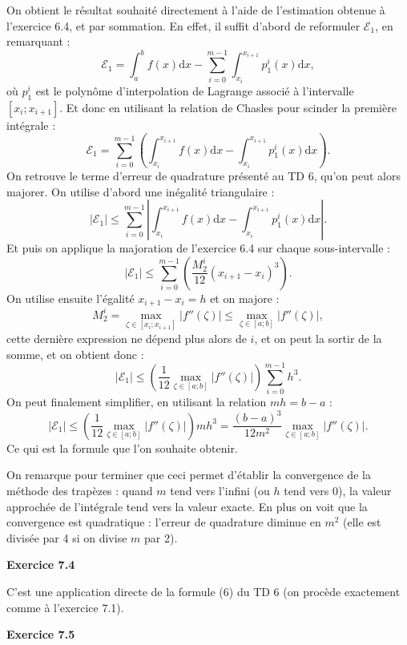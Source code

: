 \documentclass{article}
\begin{document}
On obtient le résultat souhaité directement à l'aide de l'estimation obtenue à l'exercice 6.4, et par sommation. En effet, il suffit d'abord de reformuler $\mathcal{E}_1$, en remarquant :
\[
\mathcal{E}_1 = \int_a^b f(x) \mathrm{d}x - \sum_{i=0}^{m-1} \int_{x_i}^{x_{i+1}} p_1^i(x) \mathrm{d}x,
\]
où $p_1^i$ est le polynôme d'interpolation de Lagrange associé à l'intervalle $[x_i;x_{i+1}]$.
Et donc en utilisant la relation de Chasles pour scinder la première intégrale :
\[
\mathcal{E}_1 = \sum_{i=0}^{m-1} \left (\int_{x_i}^{x_{i+1}} f(x) \mathrm{d}x - \int_{x_i}^{x_{i+1}} p_1^i(x) \mathrm{d}x \right ).
\]
On retrouve le terme d'erreur de quadrature présenté au TD 6, qu'on peut alors majorer. On utilise d'abord une inégalité triangulaire :
\[
| \mathcal{E}_1 | \leq  \sum_{i=0}^{m-1} \left  | \int_{x_i}^{x_{i+1}} f(x) \mathrm{d}x - \int_{x_i}^{x_{i+1}} p_1^i(x) \mathrm{d}x \right |.
\]
Et puis on applique la majoration de l'exercice 6.4 sur chaque sous-intervalle :
\[
| \mathcal{E}_1 | \leq  \sum_{i=0}^{m-1} \left  ( \frac{M_2^i}{12} (x_{i+1}-x_i)^3 \right ).
\]
On utilise ensuite l'égalité $x_{i+1}-x_i=h$ et on majore :
\[
M_2^i = \max_{\zeta \in [x_i;x_{i+1}]} |f''(\zeta)| \leq
\max_{\zeta \in [a;b]} |f''(\zeta)|,
\]
cette dernière expression ne dépend plus alors de $i$, et on peut la sortir de la somme, et on obtient donc :
\[
| \mathcal{E}_1 | \leq  \left  ( \frac{1}{12} \max_{\zeta \in [a;b]} |f''(\zeta)|  \right ) \sum_{i=0}^{m-1} h^3.
\]
On peut finalement simplifier, en utilisant la relation $m h = b - a$ :
\[
| \mathcal{E}_1 | \leq  \left  ( \frac{1}{12} \max_{\zeta \in [a;b]} |f''(\zeta)|  \right ) m h^3
= \frac{(b-a)^3}{12 m^2} \max_{\zeta \in [a;b]} |f''(\zeta)|. 
\]
Ce qui est la formule que l'on souhaite obtenir.

\medskip

On remarque pour terminer que ceci permet d'établir la convergence de la méthode des trapèzes : quand $m$ tend vers l'infini (ou $h$ tend vers $0$), la valeur approchée de l'intégrale tend vers la valeur exacte. En plus on voit que la convergence est quadratique : l'erreur de quadrature diminue en $m^2$ (elle est divisée par 4 si on divise $m$ par 2).

\medskip

{\bf Exercice 7.4}

C'est une application directe de la formule (6) du TD 6 (on procède exactement comme à l'exercice 7.1).

\medskip

{\bf Exercice 7.5}
\end{document}
